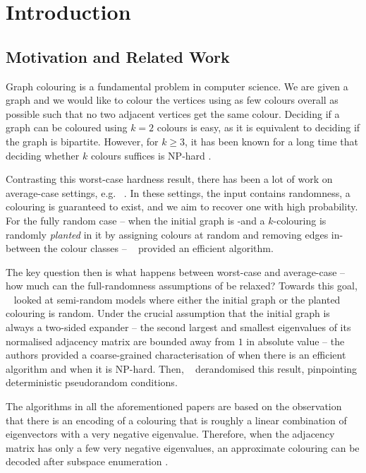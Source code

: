 \section{Introduction}

\subsection{Motivation and Related Work}

Graph colouring is a fundamental problem in computer science. We are given a graph and we would like to colour the vertices using as few colours overall as possible such that no two adjacent vertices get the same colour. Deciding if a graph can be coloured using $k=2$ colours is easy, as it is equivalent to deciding if the graph is bipartite. However, for \(k\ge 3\), it has been known for a long time that deciding whether \(k\) colours suffices is NP-hard \cite{MR4679190-Karp72}.

Contrasting this worst-case hardness result, there has been a lot of work on average-case settings, e.g. ~\cite{MR1344544-Blum95}. In these settings, the input contains randomness, a colouring is guaranteed to exist, and we aim to recover one with high probability. For the fully random case -- when the initial graph is \Erdos-\Renyi and a $k$-colouring is randomly \textit{planted} in it by assigning colours at random and removing edges in-between the colour classes -- ~\cite{MR1484153-Alon97} provided an efficient algorithm.

The key question then is what happens between worst-case and average-case -- how much can the full-randomness assumptions of \cite{MR1484153-Alon97} be relaxed? Towards this goal, ~\cite{MR3536556-David16} looked at semi-random models where either the initial graph or the planted colouring is random. Under the crucial assumption that the initial graph is always a two-sided expander -- the second largest and smallest eigenvalues of its normalised adjacency matrix are bounded away from \(1\) in absolute value -- the authors provided a coarse-grained characterisation of when there is an efficient algorithm and when it is NP-hard. Then, ~\cite{kumar2018finding} derandomised this result, pinpointing deterministic pseudorandom conditions.

The algorithms in all the aforementioned papers are based on the observation that there is an encoding of a colouring that is roughly a linear combination of eigenvectors with a very negative eigenvalue. Therefore, when the adjacency matrix has only a few very negative eigenvalues, an approximate colouring can be decoded after subspace enumeration \cite{kumar2018finding}.

